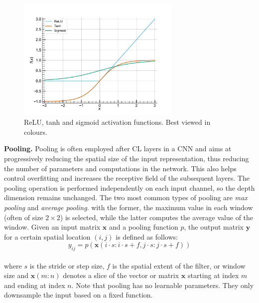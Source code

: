 \begin{figure}[htbp]
  \centering
  \includegraphics[width=0.7\textwidth]{chapter_dlo/assets/activation_functions.pdf}
  \caption{\ac{ReLU}, tanh and sigmoid activation functions. Best viewed in
  colours.}
  \label{fig:dlo:activation_functions}
\end{figure}

\noindent \textbf{Pooling.} Pooling is often employed after \ac{CL} layers
in a \ac{CNN} and aims at progressively reducing the spatial size of the input
representation, thus reducing the number of parameters and computations in the
network. This also helps control overfitting and increases the receptive field
of the subsequent layers. The pooling operation is performed independently on
each input channel, so the depth dimension remains unchanged. The two most
common types of pooling are \emph{max pooling} and \emph{average pooling}. with
the former, the maximum value in each window (often of size $2\times 2$) is
selected, while the latter computes the average value of the window. Given an
input matrix $\mathbf{x}$ and a pooling function $p$, the output matrix $
\mathbf{y} $ for a certain spatial location $(i, j)$ is defined as follows:\\

\begin{equation}
  \label{eqn:dlo:pooling}
  y_{ij} = p \left( \mathbf{x}(i⋅s:i⋅s+f,j⋅s:j⋅s+f) \right)
\end{equation}\\

\noindent where $s$ is the stride or step size, $f$ is the spatial extent of the
filter, or window size and $\mathbf{x}(m:n)$ denotes a slice of the vector or
matrix $\mathbf{x}$ starting at index $m$ and ending at index $n$. Note that
pooling has no learnable parameters. They only downsample the input based on a
fixed function.\\


